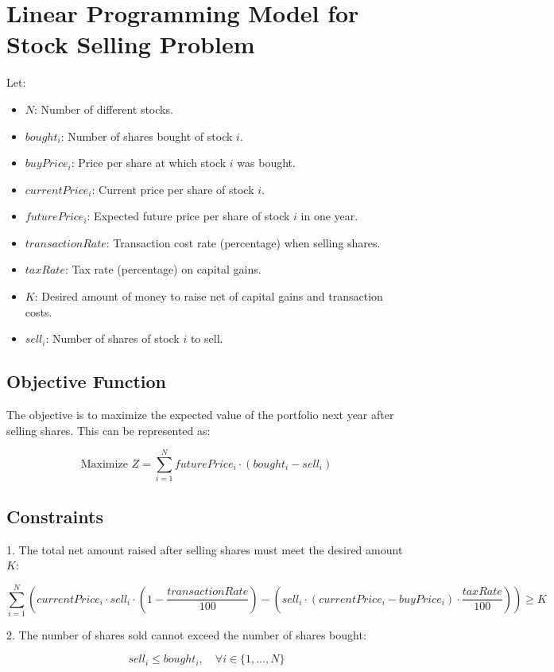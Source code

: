 \documentclass{article}
\begin{document}
\section*{Linear Programming Model for Stock Selling Problem}

Let:
\begin{itemize}
    \item \( N \): Number of different stocks.
    \item \( bought_i \): Number of shares bought of stock \( i \).
    \item \( buyPrice_i \): Price per share at which stock \( i \) was bought.
    \item \( currentPrice_i \): Current price per share of stock \( i \).
    \item \( futurePrice_i \): Expected future price per share of stock \( i \) in one year.
    \item \( transactionRate \): Transaction cost rate (percentage) when selling shares.
    \item \( taxRate \): Tax rate (percentage) on capital gains.
    \item \( K \): Desired amount of money to raise net of capital gains and transaction costs.
    \item \( sell_i \): Number of shares of stock \( i \) to sell.
\end{itemize}

\subsection*{Objective Function}
The objective is to maximize the expected value of the portfolio next year after selling shares. This can be represented as:

\[
\text{Maximize } Z = \sum_{i=1}^{N} futurePrice_i \cdot (bought_i - sell_i)
\]

\subsection*{Constraints}
1. The total net amount raised after selling shares must meet the desired amount \( K \):

\[
\sum_{i=1}^{N} \left( currentPrice_i \cdot sell_i \cdot (1 - \frac{transactionRate}{100}) - (sell_i \cdot (currentPrice_i - buyPrice_i) \cdot \frac{taxRate}{100}) \right) \geq K
\]

2. The number of shares sold cannot exceed the number of shares bought:

\[
sell_i \leq bought_i, \quad \forall i \in \{1, \ldots, N\}
\]
\end{document}
